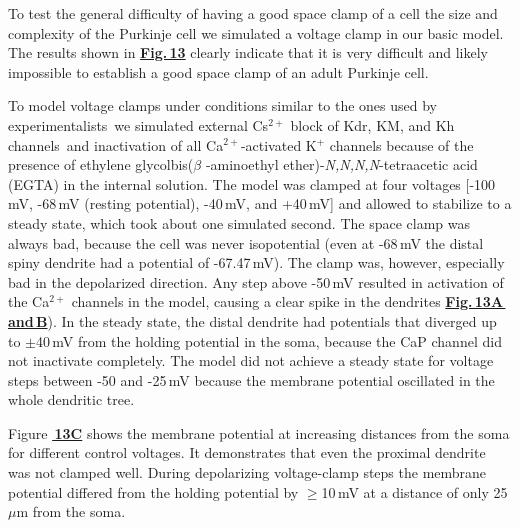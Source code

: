 \documentclass[12pt]{article}
\begin{document}
To test the general difficulty of having a good space
clamp of a cell the size and complexity of the Purkinje cell
we simulated a voltage clamp in our basic model. The results
shown in \href{../pub-purkinje-deschutter1-fig-13/pub-purkinje-deschutter1-fig-13.tex}{\bf Fig.\,13} clearly indicate that it is very difficult
and likely impossible to establish a good space clamp of an
adult Purkinje cell.

To model voltage clamps under conditions similar to the
ones used by experimentalists\,\cite{Llano:1991qf} we simulated
external Cs$^{2+}$ block of Kdr, KM, and Kh channels\,\cite{Hille:1991zr}
and inactivation of all Ca$^{2+}$-activated K$^{+}$
channels because of the presence of ethylene glycolbis($\beta$
-aminoethyl ether)-{\it N,N,N,N}-tetraacetic acid (EGTA)
in the internal solution. The model was clamped at four
voltages [-100\,mV, -68\,mV (resting potential), -40\,mV,
and +40\,mV] and allowed to stabilize to a steady state,
which took about one simulated second. The space clamp
was always bad, because the cell was never isopotential
(even at -68\,mV the distal spiny dendrite had a potential of
-67.47\,mV). The clamp was, however, especially bad in
the depolarized direction. Any step above -50\,mV resulted
in activation of the Ca$^{2+}$ channels in the model, causing a
clear spike in the dendrites \href{../pub-purkinje-deschutter1-fig-13/pub-purkinje-deschutter1-fig-13.tex}{\bf Fig.\,13A\,and\,B}). In the steady
state, the distal dendrite had potentials that diverged up to
$\pm$40\,mV from the holding potential in the soma, because
the CaP channel did not inactivate completely. The model
did not achieve a steady state for voltage steps between -50
and -25\,mV because the membrane potential oscillated in
the whole dendritic tree.

Figure \href{../pub-purkinje-deschutter1-fig-13/pub-purkinje-deschutter1-fig-13.tex}{\bf\,13C} shows the membrane potential at increasing
distances from the soma for different control voltages. It
demonstrates that even the proximal dendrite was not
clamped well. During depolarizing voltage-clamp steps the
membrane potential differed from the holding potential by
$\geq$10\,mV at a distance of only 25\,$\mu$m from the soma.



\end{document}
